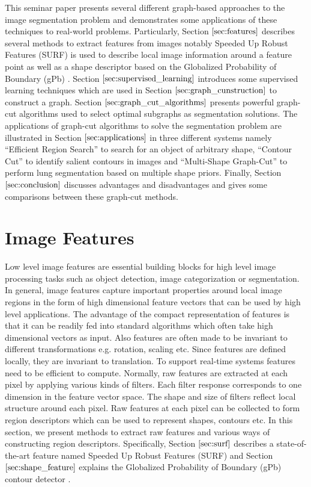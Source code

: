 \documentclass{SMBV13}
\begin{document}
This seminar paper presents several different graph-based approaches to the image segmentation problem and demonstrates some applications of these techniques to real-world problems. Particularly, Section $\ref{sec:features}$ describes several methods to extract features from images notably Speeded Up Robust Features (SURF) \cite{bay2006surf} is used to describe local image information around a feature point as well as a shape descriptor \cite{gu2009recognition} based on the Globalized Probability of Boundary (gPb) \cite{martin2004learning} \cite{maire2008using}. Section $\ref{sec:supervised_learning}$ introduces some supervised learning techniques which are used in Section $\ref{sec:graph_cunstruction}$ to construct a graph. Section $\ref{sec:graph_cut_algorithms}$ presents powerful graph-cut algorithms used to select optimal subgraphs as segmentation solutions. The applications of graph-cut algorithms to solve the segmentation problem are illustrated in Section $\ref{sec:applications}$ in three different systems namely ``Efficient Region Search'' \cite{VijayGrauman2011} to search for an object of arbitrary shape, ``Contour Cut'' \cite{KenGalShi2011} to identify salient contours in images and ``Multi-Shape Graph-Cut'' \cite{nakagomimulti} to perform lung segmentation based on multiple shape priors. Finally, Section $\ref{sec:conclusion}$ discusses advantages and disadvantages and gives some comparisons between these graph-cut methods.


%
\section{Image Features}
\label{sec:features}
Low level image features are essential building blocks for high level image processing tasks such as object detection, image categorization or segmentation. In general, image features capture important properties around local image regions in the form of high dimensional feature vectors that can be used by high level applications. The advantage of the compact representation of features is that it can be readily fed into standard algorithms which often take high dimensional vectors as input. Also features are often made to be invariant to different transformations e.g. rotation, scaling etc. Since features are defined locally, they are invariant to translation. To support real-time systems features need to be efficient to compute. Normally, raw features are extracted at each pixel by applying various kinds of filters. Each filter response corresponds to one dimension in the feature vector space. The shape and size of filters reflect local structure around each pixel. Raw features at each pixel can be collected to form region descriptors which can be used to represent shapes, contours etc. In this section, we present methods to extract raw features and various ways of constructing region descriptors. Specifically, Section $\ref{sec:surf}$ describes a state-of-the-art feature named Speeded Up Robust Features (SURF) \cite{bay2006surf} and Section $\ref{sec:shape_feature}$ explains the Globalized Probability of Boundary (gPb) contour detector \cite{maire2008using}.
\end{document}
